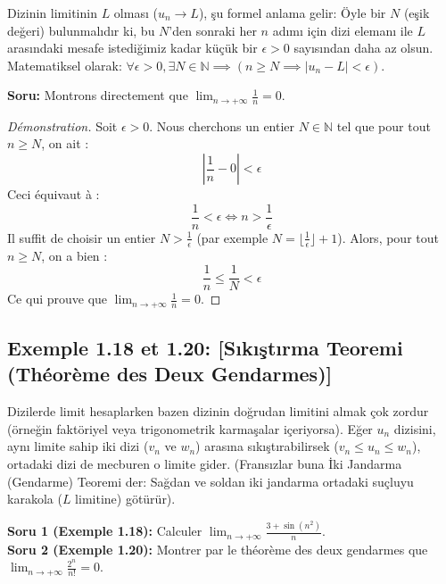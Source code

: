 \documentclass[12pt,a4paper]{report}
\begin{document}
\begin{tcolorbox}[colback=purple!5!white,colframe=purple!75!black,title=Hatırlatma (Rappel): Limitin Formel Tanımı]
Dizinin limitinin $L$ olması ($u_n \to L$), şu formel anlama gelir:
Öyle bir $N$ (eşik değeri) bulunmalıdır ki, bu $N$'den sonraki her $n$ adımı için dizi elemanı ile $L$ arasındaki mesafe istediğimiz kadar küçük bir $\epsilon > 0$ sayısından daha az olsun.
Matematiksel olarak: $\forall \epsilon > 0, \exists N \in \mathbb{N} \implies (n \ge N \implies |u_n - L| < \epsilon)$.
\end{tcolorbox}

\textbf{Soru:}
Montrons directement que $\lim_{n \to +\infty} \frac{1}{n} = 0$.

\begin{proof}[Démonstration]
Soit $\epsilon > 0$. Nous cherchons un entier $N \in \mathbb{N}$ tel que pour tout $n \ge N$, on ait :
\[ \left| \frac{1}{n} - 0 \right| < \epsilon \]
Ceci équivaut à :
\[ \frac{1}{n} < \epsilon \iff n > \frac{1}{\epsilon} \]
Il suffit de choisir un entier $N > \frac{1}{\epsilon}$ (par exemple $N = \lfloor \frac{1}{\epsilon} \rfloor + 1$).
Alors, pour tout $n \ge N$, on a bien :
\[ \frac{1}{n} \le \frac{1}{N} < \epsilon \]
Ce qui prouve que $\lim_{n \to +\infty} \frac{1}{n} = 0$.
\end{proof}

\subsection*{Exemple 1.18 et 1.20: [Sıkıştırma Teoremi (Théorème des Deux Gendarmes)]}

\begin{tcolorbox}[colback=orange!5!white,colframe=orange!75!black,title=Hatırlatma (Rappel): Sıkıştırma Teoremi (Sandviç Kuralı)]
Dizilerde limit hesaplarken bazen dizinin doğrudan limitini almak çok zordur (örneğin faktöriyel veya trigonometrik karmaşalar içeriyorsa).
Eğer $u_n$ dizisini, aynı limite sahip iki dizi ($v_n$ ve $w_n$) arasına sıkıştırabilirsek ($v_n \le u_n \le w_n$), ortadaki dizi de mecburen o limite gider.
(Fransızlar buna İki Jandarma (Gendarme) Teoremi der: Sağdan ve soldan iki jandarma ortadaki suçluyu karakola ($L$ limitine) götürür).
\end{tcolorbox}

\textbf{Soru 1 (Exemple 1.18):} Calculer $\lim_{n \to +\infty} \frac{3 + \sin(n^2)}{n}$.\\
\textbf{Soru 2 (Exemple 1.20):} Montrer par le théorème des deux gendarmes que $\lim_{n \to +\infty} \frac{2^n}{n!} = 0$.
\end{document}
